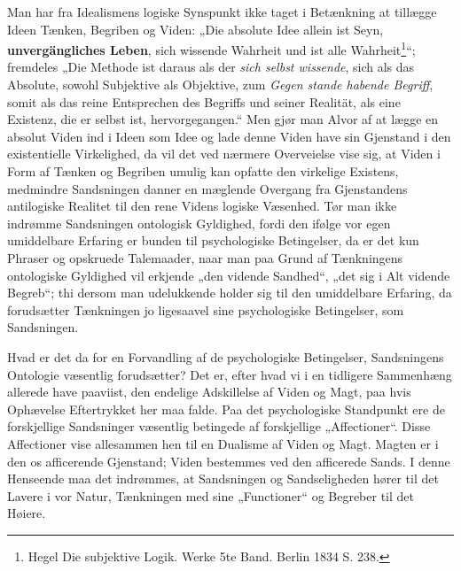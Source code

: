 \documentclass[11pt]{book}
\newcommand{\opage}[1]{\marginnote{\footnotesize\textit{[#1]}}}
\begin{document}
Man har fra Idealismens logiske Synspunkt ikke taget i Betænkning at
tillægge Ideen Tænken, Begriben og Viden: „Die absolute Idee allein ist
Seyn, \textbf{unvergängliches Leben}, sich wissende Wahrheit und ist
alle Wahrheit\footnote{%
Hegel Die subjektive Logik. Werke 5te Band. Berlin 1834 S. 238.}“;
fremdeles „Die
\opage{257} \setcounter{footnote}{0}%
Methode ist daraus als der \emph{sich selbst wissende}, sich als das
Absolute, sowohl Subjektive als Objektive, zum \emph{Gegen\-%
stande habende Begriff}, somit als das reine Entsprechen des Begriffs
und seiner Realität, als eine Existenz, die er selbst ist,
hervorgegangen.“ Men gjør man Alvor af at lægge en absolut Viden ind i
Ideen som Idee og lade denne Viden have sin Gjenstand i den
existentielle Virkelighed, da vil det ved nærmere Overveielse vise sig,
at Viden i Form af Tænken og Begriben umulig kan opfatte den virkelige
Existens, medmindre Sandsningen danner en mæglende Overgang fra
Gjenstandens antilogiske Realitet til den rene Videns logiske
Væsenhed. Tør man ikke indrømme Sandsningen ontologisk Gyldighed, fordi
den ifølge vor egen umiddelbare Erfaring er bunden til psychologiske
Betingelser, da er det kun Phraser og opskruede Talemaader, naar man
paa Grund af Tænkningens ontologiske Gyldighed vil erkjende „den
vidende Sandhed“, „det sig i Alt vidende Begreb“; thi dersom man
udelukkende holder sig til den umiddelbare Erfaring, da forudsætter
Tænkningen jo ligesaavel sine psychologiske Betingelser, som
Sandsningen.

Hvad er det da for en Forvandling af de psychologiske Betingelser,
Sandsningens Ontologie væsentlig forudsætter? Det er, efter hvad vi i
en tidligere Sammenhæng allerede have paaviist, den endelige
Adskillelse af Viden og Magt, paa hvis Ophævelse Eftertrykket her maa
falde. Paa det psychologiske Standpunkt ere de forskjellige
Sandsninger væsentlig betingede af forskjellige „Affectioner“.
Disse Affectioner vise allesammen hen til en Dualisme af Viden og Magt.
Magten er i den os afficerende Gjenstand; Viden bestemmes ved den
afficerede Sands. I denne Henseende maa det indrømmes, at Sandsningen
og Sandseligheden hører til det Lavere i vor Natur, Tænkningen med sine
„Functioner“ og Begreber til det Høiere.
\end{document}
